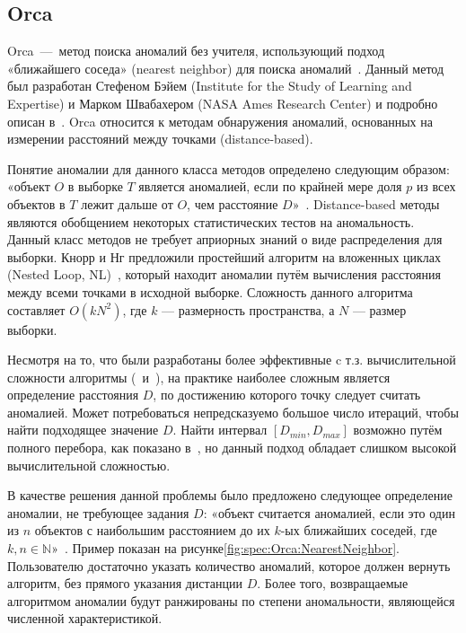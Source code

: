\subsection{Orca}
\label{subsec:spec:Orca}
Orca~---~метод поиска аномалий без учителя, использующий подход «ближайшего соседа» (nearest neighbor) для поиска аномалий~\cite{SchwabacherMachLearnAppl}. Данный метод был разработан Стефеном Бэйем (Institute for the Study of Learning and Expertise) и Марком Швабахером (NASA Ames Research Center) и подробно описан в~\cite{BaySchwabacherOrca}. Orca относится к методам обнаружения аномалий, основанных на измерении расстояний между точками (distance-based).

Понятие аномалии для данного класса методов определено следующим образом: «объект $O$ в выборке $T$ является аномалией, если по крайней мере доля $p$ из всех объектов в $T$ лежит дальше от $O$, чем расстояние $D$»~\cite{KnorrNgDistBasedAlgorithms}. Distance-based методы являются обобщением некоторых статистических тестов на аномальность. Данный класс методов не требует априорных знаний о виде распределения для выборки. Кнорр и Нг предложили простейший алгоритм на вложенных циклах (Nested Loop, NL)~\cite{KnorrNgDistBasedAlgorithms}, который находит аномалии путём вычисления расстояния между всеми точками в исходной выборке. Сложность данного алгоритма составляет $O(kN^2)$, где $k$ --- размерность пространства, а $N$ --- размер выборки.

Несмотря на то, что были разработаны более эффективные c т.з. вычислительной сложности алгоритмы (\cite{TaoMiningDistBasedOutliersFromLargeDB}~и~\cite{AngiulliVeryEfficientMiningDistBasedOutliers}), на практике наиболее сложным является определение расстояния $D$, по достижению которого точку следует считать аномалией. Может потребоваться непредсказуемо большое число итераций, чтобы найти подходящее значение $D$. Найти интервал $[D_{min}, D_{max}]$ возможно путём полного перебора, как показано в~\cite{TaoMiningDistBasedOutliersFromLargeDB}, но данный подход обладает слишком высокой вычислительной сложностью.

В качестве решения данной проблемы было предложено следующее определение аномалии, не требующее задания $D$: «объект считается аномалией, если это один из $n$ объектов с наибольшим расстоянием до их $k$-ых ближайших соседей, где~\mbox{$k,n\in\mathbb{N}$}»~\cite{RamaswamyEffAlgoMiningOutliers}. Пример показан на рисунке\ref{fig:spec:Orca:NearestNeighbor}. Пользователю достаточно указать количество аномалий, которое должен вернуть алгоритм, без прямого указания дистанции $D$. Более того, возвращаемые алгоритмом аномалии будут ранжированы по степени аномальности, являющейся численной характеристикой.

